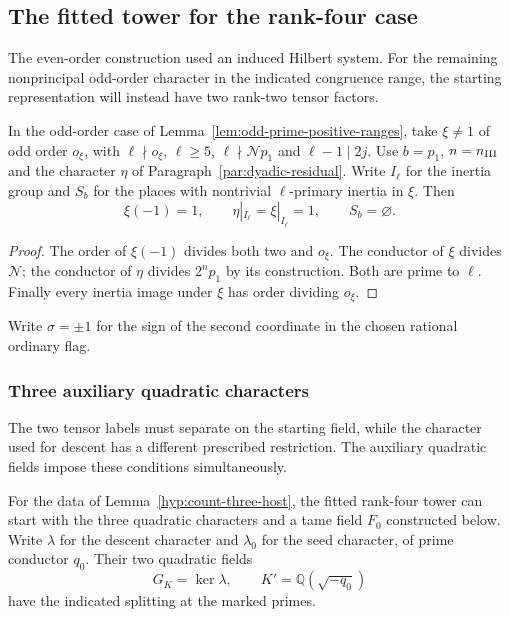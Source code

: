 \subsection{The fitted tower for the rank-four case}
\label{sec:count-three-tower}

The even-order construction used an induced Hilbert system. For the remaining nonprincipal odd-order character in the indicated congruence range, the starting representation will instead have two rank-two tensor factors.

\begin{established}\label{hyp:count-three-host}
In the odd-order case of Lemma~\ref{lem:odd-prime-positive-ranges},
take \(\xi\ne1\) of odd order \(o_\xi\), with
\(\ell\nmid o_\xi\), \(\ell\ge5\),
\(\ell\nmid\mathcal Np_1\) and \(\ell-1\mid2j\).
Use \(b=p_1\), \(n=n_{\rm III}\) and the character
\(\eta\) of Paragraph~\ref{par:dyadic-residual}.
Write \(I_\ell\) for the inertia group and \(S_b\) for the places
with nontrivial \(\ell\)-primary inertia in \(\xi\). Then
\[
      \xi(-1)=1,\qquad \eta|_{I_\ell}=\xi|_{I_\ell}=1,\qquad S_b=\varnothing .
\]
\end{established}
\begin{proof}
The order of \(\xi(-1)\) divides both two and \(o_\xi\).
The conductor of \(\xi\) divides \(\mathcal N\); the conductor
of \(\eta\) divides \(2^n p_1\) by its construction. Both are
prime to \(\ell\). Finally every inertia image under \(\xi\)
has order dividing \(o_\xi\).
\end{proof}
Write \(\sigma=\pm1\) for the sign of the second coordinate in
the chosen rational ordinary flag.

\subsubsection{Three auxiliary quadratic characters}

The two tensor labels must separate on the starting field, while the character used for descent has a different prescribed restriction. The auxiliary quadratic fields impose these conditions simultaneously.

\begin{proposition}\label{prop:count-three-starting-fields}
For the data of Lemma~\ref{hyp:count-three-host}, the fitted rank-four tower can start with the
three quadratic characters and a tame field \(F_0\) constructed
below. Write \(\lambda\) for the descent character and \(\lambda_0\) for the seed character, of prime conductor \(q_0\). Their two quadratic fields 
\[
 G_K=\ker\lambda,\qquad K'=\mathbb Q(\sqrt{-q_0})
\]
 have the indicated splitting at the marked primes.
\end{proposition}

